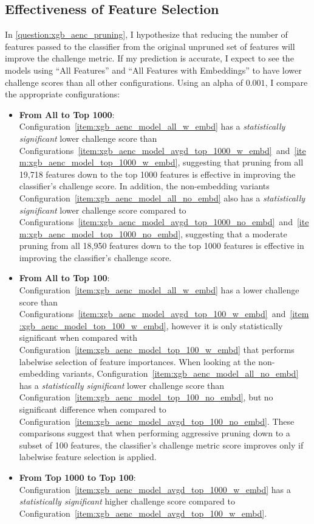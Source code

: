 \documentclass[\main/thesis.tex]{subfiles}
\begin{document}
\subsection{Effectiveness of Feature Selection}
In \ref{question:xgb_aenc_pruning}, I hypothesize that reducing the number of features passed to the classifier from the original unpruned set of features will improve the challenge metric.
If my prediction is accurate, I expect to see the models using ``All Features'' and ``All Features with Embeddings'' to have lower challenge scores than all other configurations.
Using an alpha of $0.001$, I compare the appropriate configurations:
\begin{itemize}
    \item \textbf{From All to Top 1000}: Configuration~\ref{item:xgb_aenc_model_all_w_embd} has a \emph{statistically significant} lower challenge score than Configurations~\ref{item:xgb_aenc_model_avgd_top_1000_w_embd}~and~\ref{item:xgb_aenc_model_top_1000_w_embd}, suggesting that pruning from all 19,718 features down to the top 1000 features is effective in improving the classifier's challenge score.
    In addition, the non-embedding variants Configuration~\ref{item:xgb_aenc_model_all_no_embd} also has a \emph{statistically significant} lower challenge score compared to Configurations~\ref{item:xgb_aenc_model_avgd_top_1000_no_embd}~and~\ref{item:xgb_aenc_model_top_1000_no_embd}, suggesting that a moderate pruning from all 18,950 features down to the top 1000 features is effective in improving the classifier's challenge score.
    \item \textbf{From All to Top 100}: Configuration~\ref{item:xgb_aenc_model_all_w_embd} has a lower challenge score than Configurations~\ref{item:xgb_aenc_model_avgd_top_100_w_embd}~and~\ref{item:xgb_aenc_model_top_100_w_embd}, however it is only statistically significant when compared with Configuration~\ref{item:xgb_aenc_model_top_100_w_embd} that performs labelwise selection of feature importances.
    When looking at the non-embedding variants, Configuration~\ref{item:xgb_aenc_model_all_no_embd} has a \emph{statistically significant} lower challenge score than Configuration~\ref{item:xgb_aenc_model_top_100_no_embd}, but no significant difference when compared to Configuration~\ref{item:xgb_aenc_model_avgd_top_100_no_embd}.
    These comparisons suggest that when performing aggressive pruning down to a subset of 100 features, the classifier's challenge metric score improves only if labelwise feature selection is applied.
    \item \textbf{From Top 1000 to Top 100}: Configuration~\ref{item:xgb_aenc_model_avgd_top_1000_w_embd} has a \emph{statistically significant} higher challenge score compared to Configuration~\ref{item:xgb_aenc_model_avgd_top_100_w_embd}.

\end{itemize}
\end{document}
